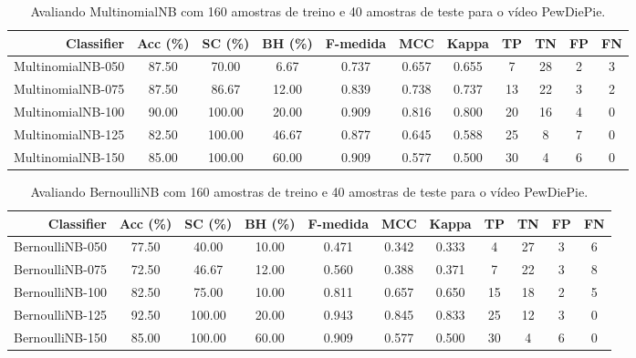 \begin{table}[!htb]
\centering
\caption{Avaliando MultinomialNB com 160 amostras de treino e 40 amostras de teste para o vídeo PewDiePie.}
\label{tab:multinomial-nb-PewDiePie}
\begin{tabular}{r|c|c|c|c|c|c|c|c|c|c}
\hline\hline
Classifier & Acc (\%) & SC (\%) & BH (\%) & F-medida & MCC & Kappa & TP & TN & FP & FN \\ \hline
MultinomialNB-050 & 87.50 & 70.00 & 6.67 & 0.737 & 0.657 & 0.655 & 7 & 28 & 2 & 3 \\ 
MultinomialNB-075 & 87.50 & 86.67 & 12.00 & 0.839 & 0.738 & 0.737 & 13 & 22 & 3 & 2 \\ 
MultinomialNB-100 & 90.00 & 100.00 & 20.00 & 0.909 & 0.816 & 0.800 & 20 & 16 & 4 & 0 \\ 
MultinomialNB-125 & 82.50 & 100.00 & 46.67 & 0.877 & 0.645 & 0.588 & 25 & 8 & 7 & 0 \\ 
MultinomialNB-150 & 85.00 & 100.00 & 60.00 & 0.909 & 0.577 & 0.500 & 30 & 4 & 6 & 0 \\ 
\hline\hline
\end{tabular}
\end{table}
\begin{table}[!htb]
\centering
\caption{Avaliando BernoulliNB com 160 amostras de treino e 40 amostras de teste para o vídeo PewDiePie.}
\label{tab:bernoulli-nb-PewDiePie}
\begin{tabular}{r|c|c|c|c|c|c|c|c|c|c}
\hline\hline
Classifier & Acc (\%) & SC (\%) & BH (\%) & F-medida & MCC & Kappa & TP & TN & FP & FN \\ \hline
BernoulliNB-050 & 77.50 & 40.00 & 10.00 & 0.471 & 0.342 & 0.333 & 4 & 27 & 3 & 6 \\ 
BernoulliNB-075 & 72.50 & 46.67 & 12.00 & 0.560 & 0.388 & 0.371 & 7 & 22 & 3 & 8 \\ 
BernoulliNB-100 & 82.50 & 75.00 & 10.00 & 0.811 & 0.657 & 0.650 & 15 & 18 & 2 & 5 \\ 
BernoulliNB-125 & 92.50 & 100.00 & 20.00 & 0.943 & 0.845 & 0.833 & 25 & 12 & 3 & 0 \\ 
BernoulliNB-150 & 85.00 & 100.00 & 60.00 & 0.909 & 0.577 & 0.500 & 30 & 4 & 6 & 0 \\ 
\hline\hline
\end{tabular}
\end{table}
